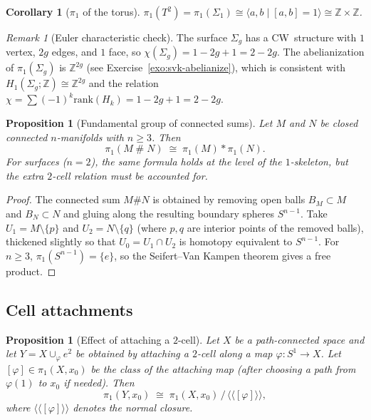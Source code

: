 \documentclass[12pt,a4paper,openany]{book}
\theoremstyle{definition}
\theoremstyle{plain}
\newtheorem{proposition}[definition]{Proposition}
\newtheorem{corollary}[definition]{Corollary}
\theoremstyle{remark}
\newtheorem{remark}[definition]{Remark}
\newcommand{\Z}{\mathbb{Z}}
\begin{document}
\begin{corollary}[$\pi_1$ of the torus]\label{cor:pi1-torus}
  $\pi_1(T^2) = \pi_1(\Sigma_1) \cong \langle a, b \mid [a,b] = 1 \rangle
  \cong \Z \times \Z$.
\end{corollary}

\begin{remark}[Euler characteristic check]\label{rem:euler-char-surfaces}
  The surface $\Sigma_g$ has a CW~structure with $1$ vertex, $2g$ edges, and
  $1$ face, so $\chi(\Sigma_g) = 1 - 2g + 1 = 2 - 2g$.  The abelianization
  of $\pi_1(\Sigma_g)$ is $\Z^{2g}$ (see Exercise~\ref{exo:svk-abelianize}),
  which is consistent with $H_1(\Sigma_g; \Z) \cong \Z^{2g}$ and the
  relation $\chi = \sum (-1)^k \mathrm{rank}(H_k) = 1 - 2g + 1 = 2 - 2g$.
\end{remark}

\begin{proposition}[Fundamental group of connected sums]\label{prop:pi1-connected-sum}
  Let $M$ and $N$ be closed connected $n$-manifolds with $n \geq 3$.  Then
  \[
    \pi_1(M \mathbin{\#} N) \;\cong\; \pi_1(M) * \pi_1(N).
  \]
  For surfaces ($n = 2$), the same formula holds at the level of the
  $1$-skeleton, but the extra $2$-cell relation must be accounted for.
\end{proposition}

\begin{proof}
  The connected sum $M \# N$ is obtained by removing open balls $B_M
  \subset M$ and $B_N \subset N$ and gluing along the resulting boundary
  spheres $S^{n-1}$.  Take $U_1 = M \setminus \{p\}$ and
  $U_2 = N \setminus \{q\}$ (where $p, q$ are interior points of the removed
  balls), thickened slightly so that $U_0 = U_1 \cap U_2$ is homotopy
  equivalent to $S^{n-1}$.  For $n \geq 3$, $\pi_1(S^{n-1}) = \{e\}$,
  so the Seifert--Van Kampen theorem gives a free product.
\end{proof}

\subsection{Cell attachments}\label{subsec:cell-attachment}

\begin{proposition}[Effect of attaching a $2$-cell]\label{prop:cell-attachment}
  Let $X$ be a path-connected space and let $Y = X \cup_\varphi e^2$ be
  obtained by attaching a $2$-cell along a map $\varphi\colon S^1 \to X$.
  Let $[\varphi] \in \pi_1(X, x_0)$ be the class of the attaching map
  (after choosing a path from $\varphi(1)$ to $x_0$ if needed).  Then
  \[
    \pi_1(Y, x_0) \;\cong\; \pi_1(X, x_0) \,\big/\, \langle\!\langle [\varphi] \rangle\!\rangle,
  \]
  where $\langle\!\langle [\varphi] \rangle\!\rangle$ denotes the normal
  closure.
\end{proposition}
\end{document}
